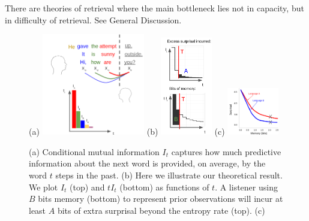 There are theories of retrieval where the main bottleneck lies not in capacity, but in difficulty of retrieval. See General Discussion.




\begin{figure}
	(a)
\includegraphics[width=0.4\textwidth]{figures-gdrive/mi-distance.png}
	(b)
\includegraphics[width=0.2\textwidth]{figures-gdrive/theorem.png}
	(c)
\includegraphics[width=0.2\textwidth]{figures-gdrive/tradeoff.png}
	\caption{
		(a) Conditional mutual information $I_t$ captures how much predictive information about the next word is provided, on average, by the word $t$ steps in the past.
		(b) Here we illustrate our theoretical result. We plot $I_t$ (top) and $tI_t$ (bottom) as functions of $t$. A listener using $B$ bits memory (bottom) to represent prior observations will incur at least $A$ bits of extra surprisal beyond the entropy rate (top). 
		(c)  
}\label{fig:theorem}
\end{figure}



